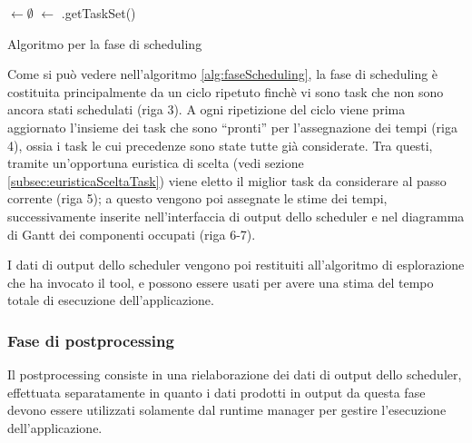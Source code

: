 \IncMargin{1em}
\begin{algorithm}[!htbp]
 
 \BlankLine
 \SchedulerOutput $\leftarrow \emptyset$\;
 \UnscheduledSet $\leftarrow$ \SchedulerInput.getTaskSet()\;
 \Return{\SchedulerOutput}
\caption{Algoritmo per la fase di scheduling}
\label{alg:faseScheduling}
\end{algorithm}
\DecMargin{1em}

Come si può vedere nell'algoritmo \ref{alg:faseScheduling}, la fase di 
scheduling è costituita principalmente da un ciclo ripetuto finchè vi sono 
task che non sono ancora stati schedulati (riga 3). A ogni ripetizione del ciclo viene 
prima aggiornato l'insieme dei task che sono ``pronti'' per l'assegnazione dei 
tempi (riga 4), ossia i task le cui precedenze sono state tutte già considerate. Tra 
questi, tramite un'opportuna euristica di scelta (vedi sezione 
\ref{subsec:euristicaSceltaTask}) viene eletto il miglior task da considerare al 
passo corrente (riga 5); a questo vengono poi assegnate le stime dei tempi, 
successivamente inserite nell'interfaccia di output dello scheduler e nel 
diagramma di Gantt dei componenti occupati (riga 6-7).

I dati di output dello scheduler vengono poi restituiti all'algoritmo di 
esplorazione che ha invocato il tool, e possono essere usati per avere una 
stima del tempo totale di esecuzione dell'applicazione.


\subsubsection{Fase di postprocessing}
\label{subsec:fasePostprocessing}
Il postprocessing consiste in una rielaborazione dei dati di output dello 
scheduler, effettuata separatamente in quanto i dati prodotti in output da 
questa fase devono essere utilizzati solamente dal runtime manager per gestire 
l'esecuzione dell'applicazione.

